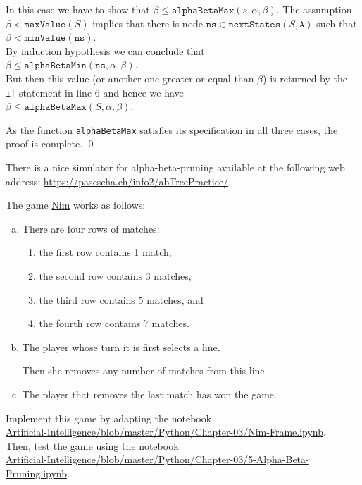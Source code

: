 \begin{enumerate}
  In this case we have to show that $\beta \leq \mathtt{alphaBetaMax}(s, \alpha, \beta)$.
  The assumption $\beta < \texttt{maxValue}(S)$ implies that there is node
  $\texttt{ns} \in \texttt{nextStates}(S, \texttt{A})$ such that 
  \\[0.2cm]
  \hspace*{1.3cm}
  $\beta < \texttt{minValue}(\texttt{ns})$.
  \\[0.2cm]
  By induction hypothesis we can conclude that
  \\[0.2cm]
  \hspace*{1.3cm}
  $\beta \leq \mathtt{alphaBetaMin}(\mathtt{ns}, \alpha, \beta)$.
  \\[0.2cm]
  But then this value (or another one greater or equal than $\beta$) is returned by the \texttt{if}-statement
  in line 6 and hence we have
  \\[0.2cm]
  \hspace*{1.3cm}
  $\beta \leq \mathtt{alphaBetaMax}(S, \alpha, \beta)$.
\end{enumerate}
As the function \texttt{alphaBetaMax} satisfies its specification in all three cases, the proof is complete. \qed

\remark
There is a nice simulator for alpha-beta-pruning available at the following web address:
\href{https://pascscha.ch/info2/abTreePractice/}{https://pascscha.ch/info2/abTreePractice/}.

\exercise
The game \href{https://en.wikipedia.org/wiki/Nim}{Nim} works as follows:
\begin{enumerate}[(a)]
\item There are four rows of matches:
      \begin{enumerate}[1.]
      \item the first  row contains 1 match,
      \item the second row contains 3 matches,
      \item the third  row contains 5 matches, and
      \item the fourth row contains 7 matches.
     \end{enumerate}
\item The player whose turn it is first selects a line.
     
      Then she removes any number of matches from this line.
\item The player that removes the last match has won the game. 
\end{enumerate}
Implement this game by adapting the notebook
\\[0.2cm]
\hspace*{1.3cm}
\href{https://github.com/karlstroetmann/Artificial-Intelligence/blob/master/Python/Chapter-03/Nim-Frame.ipynb}{
   Artificial-Intelligence/blob/master/Python/Chapter-03/Nim-Frame.ipynb}.
\\[0.2cm]
 Then,  test the game using the notebook
\\[0.2cm]
\hspace*{1.3cm}
\href{https://github.com/karlstroetmann/Artificial-Intelligence/blob/master/Python/Chapter-03/5-Alpha-Beta-Pruning.ipynb}{Artificial-Intelligence/blob/master/Python/Chapter-03/5-Alpha-Beta-Pruning.ipynb}.
\eox


